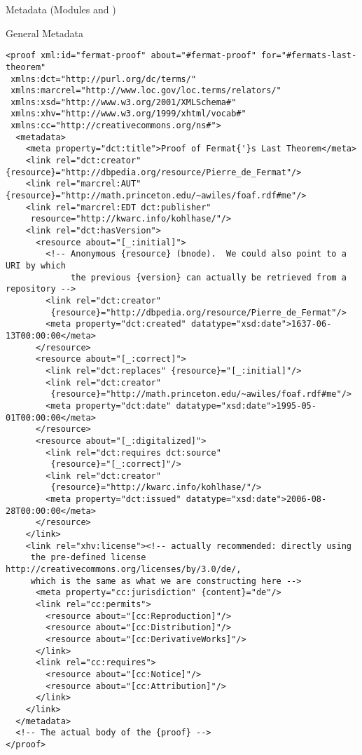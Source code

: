 \begin{tchapter}[id=metadata,short=Metadata]{Metadata (Modules {} and  {})}
\begin{tsection}{General Metadata}
\begin{lstlisting}[float,caption={Proof of Fermat's last theorem, with \omdoc's new \rdfa metadata},label={fig:fermat-omdoc-md},language={[1.6]OMDoc},escapeinside={\{\}}]
<proof xml:id="fermat-proof" about="#fermat-proof" for="#fermats-last-theorem"
 xmlns:dct="http://purl.org/dc/terms/"
 xmlns:marcrel="http://www.loc.gov/loc.terms/relators/"
 xmlns:xsd="http://www.w3.org/2001/XMLSchema#"
 xmlns:xhv="http://www.w3.org/1999/xhtml/vocab#"
 xmlns:cc="http://creativecommons.org/ns#">
  <metadata>
    <meta property="dct:title">Proof of Fermat{'}s Last Theorem</meta>
    <link rel="dct:creator" {resource}="http://dbpedia.org/resource/Pierre_de_Fermat"/>
    <link rel="marcrel:AUT" {resource}="http://math.princeton.edu/~awiles/foaf.rdf#me"/>
    <link rel="marcrel:EDT dct:publisher"
     resource="http://kwarc.info/kohlhase/"/>
    <link rel="dct:hasVersion">
      <resource about="[_:initial]">
        <!-- Anonymous {resource} (bnode).  We could also point to a URI by which
             the previous {version} can actually be retrieved from a repository -->
        <link rel="dct:creator"
         {resource}="http://dbpedia.org/resource/Pierre_de_Fermat"/>
        <meta property="dct:created" datatype="xsd:date">1637-06-13T00:00:00</meta>
      </resource>
      <resource about="[_:correct]">
        <link rel="dct:replaces" {resource}="[_:initial]"/>
        <link rel="dct:creator"
         {resource}="http://math.princeton.edu/~awiles/foaf.rdf#me"/>
        <meta property="dct:date" datatype="xsd:date">1995-05-01T00:00:00</meta>
      </resource>
      <resource about="[_:digitalized]">
        <link rel="dct:requires dct:source"
         {resource}="[_:correct]"/>
        <link rel="dct:creator"
         {resource}="http://kwarc.info/kohlhase/"/>
        <meta property="dct:issued" datatype="xsd:date">2006-08-28T00:00:00</meta>
      </resource>
    </link>
    <link rel="xhv:license"><!-- actually recommended: directly using
     the pre-defined license http://creativecommons.org/licenses/by/3.0/de/,
     which is the same as what we are constructing here -->
      <meta property="cc:jurisdiction" {content}="de"/>
      <link rel="cc:permits">
        <resource about="[cc:Reproduction]"/>
        <resource about="[cc:Distribution]"/>
        <resource about="[cc:DerivativeWorks]"/>
      </link>
      <link rel="cc:requires">
        <resource about="[cc:Notice]"/>
        <resource about="[cc:Attribution]"/>
      </link>
    </link>
  </metadata>
  <!-- The actual body of the {proof} -->
</proof>
\end{lstlisting}


\end{tsection}
\end{tchapter}
